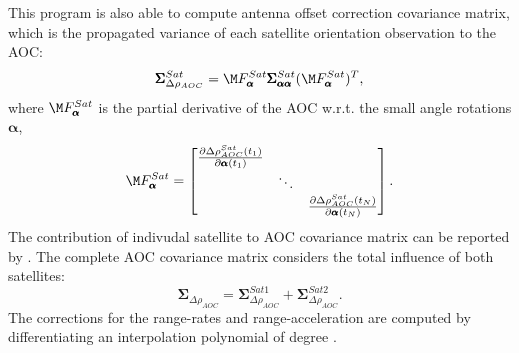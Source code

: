 This program is also able to compute antenna offset correction covariance matrix,
which is the propagated variance of each satellite orientation observation to the AOC:
\begin{equation}
  \pmb{\Sigma}_{\Delta\rho_{AOC}}^{Sat} = \M F_{\pmb{\alpha}}^{Sat}\pmb{\Sigma}_{\pmb{\alpha\alpha}}^{Sat}(\M F_{\pmb{\alpha}}^{Sat})^T,
\end{equation}
where $\M F_{\pmb{\alpha}}^{Sat}$ is the partial derivative of the AOC w.r.t. the small angle rotations $\pmb{\alpha}$,
\begin{equation}
  \M F_{\pmb{\alpha}}^{Sat} =
  \begin{bmatrix}
  \frac{\partial \Delta\rho_{AOC}^{Sat}(t_1)}{\partial\pmb{\alpha}(t_1)} &        &  \\
          & \ddots &  \\
          &        & \frac{\partial \Delta\rho_{AOC}^{Sat}(t_N)}{\partial\pmb{\alpha}(t_N)}
  \end{bmatrix}.
\end{equation}
The contribution of indivudal satellite to AOC covariance matrix can be reported by
. The complete AOC covariance matrix
 considers the total influence of both satellites:
\begin{equation}
  \pmb{\Sigma}_{\Delta\rho_{AOC}} = \pmb{\Sigma}_{\Delta\rho_{AOC}}^{Sat1} + \pmb{\Sigma}_{\Delta\rho_{AOC}}^{Sat2}.
\end{equation}
The corrections for the range-rates and range-acceleration are computed by differentiating
an interpolation polynomial of degree .



